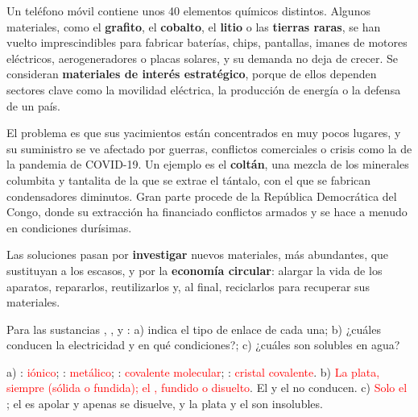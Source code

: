 Un teléfono móvil contiene unos 40 elementos químicos distintos. Algunos materiales, como el \textbf{grafito}, el
\textbf{cobalto}, el \textbf{litio} o las \textbf{tierras raras}, se han vuelto imprescindibles para fabricar baterías, chips,
pantallas, imanes de motores eléctricos, aerogeneradores o placas solares, y su demanda no deja de crecer. Se consideran
\textbf{materiales de interés estratégico}, porque de ellos dependen sectores clave como la movilidad eléctrica, la producción de
energía o la defensa de un país.

El problema es que sus yacimientos están concentrados en muy pocos lugares, y su suministro se ve afectado por guerras,
conflictos comerciales o crisis como la de la pandemia de COVID-19. Un ejemplo es el \textbf{coltán}, una mezcla de los minerales
columbita y tantalita de la que se extrae el tántalo, con el que se fabrican condensadores diminutos. Gran parte procede de la
República Democrática del Congo, donde su extracción ha financiado conflictos armados y se hace a menudo en condiciones
durísimas.

Las soluciones pasan por \textbf{investigar} nuevos materiales, más abundantes, que sustituyan a los escasos, y por la
\textbf{economía circular}: alargar la vida de los aparatos, repararlos, reutilizarlos y, al final, reciclarlos para recuperar
sus materiales.

\begin{exercise}
    Para las sustancias , ,  y : a) indica el tipo de enlace de cada una; b) ¿cuáles conducen la
    electricidad y en qué condiciones?; c) ¿cuáles son solubles en agua?
    \begin{solu}
        a) : \textcolor{red}{iónico}; : \textcolor{red}{metálico}; : \textcolor{red}{covalente molecular};
        : \textcolor{red}{cristal covalente}. b) \textcolor{red}{La plata, siempre (sólida o fundida); el ,
        fundido o disuelto}. El  y el  no conducen. c) \textcolor{red}{Solo el }; el  es apolar y
        apenas se disuelve, y la plata y el  son insolubles.
    \end{solu}
\end{exercise}


